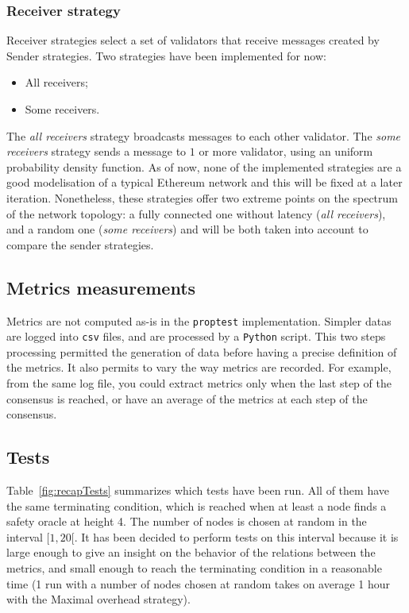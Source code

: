 \subsubsection{Receiver strategy}
Receiver strategies select a set of validators that receive messages created by
Sender strategies. Two strategies have been implemented for now: 
\begin{itemize}
        \item All receivers;
        \item Some receivers.
\end{itemize}

The \textit{all receivers} strategy broadcasts messages to each other validator.
The \textit{some receivers} strategy sends a message to \(1\) or more validator,
using an uniform probability density function.  As of now, none of the
implemented strategies are a good modelisation of a typical Ethereum network and
this will be fixed at a later iteration.  Nonetheless, these strategies offer
two extreme points on the spectrum of the network topology: a fully connected
one without latency (\textit{all receivers}), and a random one (\textit{some
receivers}) and will be both taken into account to compare the sender
strategies.

\subsection{Metrics measurements}
Metrics are not computed as-is in the \texttt{proptest} implementation. Simpler
datas are logged into \texttt{csv} files, and are processed by a \texttt{Python}
script.  This two steps processing permitted the generation of
data before having a precise definition of the metrics. It also permits to vary
the way metrics are recorded. For example, from the same log file, you could
extract metrics only when the last step of the consensus is reached, or have an
average of the metrics at each step of the consensus.

\subsection{Tests}
Table~\ref{fig:recapTests} summarizes which tests have been run.
All of them have the same terminating condition, which is reached when at least a
node finds a safety oracle at height 4. The number of nodes is chosen at random
in the interval \([1, 20[\). It has been decided to perform tests on this
interval because it is large enough to give an insight on the behavior of the
relations between the metrics, and small enough to reach the terminating condition in
a reasonable time (1 run with a number of nodes chosen at random takes on average 1 hour
with the Maximal overhead strategy).

